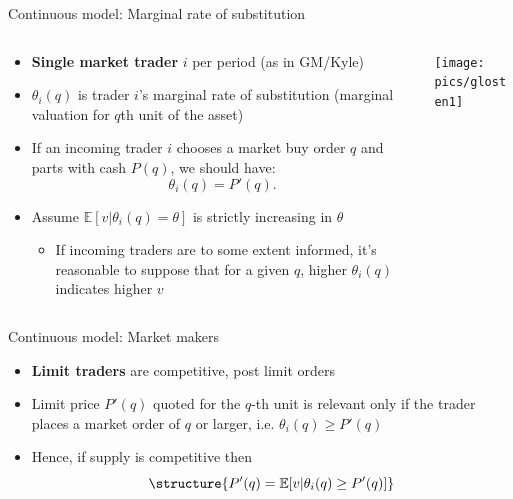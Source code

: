 \documentclass[english,10pt
,aspectratio=169
]{beamer}
\begin{document}
\begin{frame}{Continuous model: Marginal rate of substitution}
	\begin{columns}
		\begin{column}{0.7\linewidth}
			\begin{itemize}
				\item \textbf{Single market trader} $i$ per period (as in GM/Kyle)
				\item $\theta_i(q)$ is trader $i$'s marginal rate of substitution (marginal valuation for $q$th unit of the asset)
				\item If an incoming trader $i$ chooses a market buy order $q$ and parts with cash $P(q)$, we should have: \[\theta_i(q) = P'(q).\]
				\item Assume $\mathbb{E}[v|\theta_i(q) = \theta]$ is strictly increasing in $\theta$
				\begin{itemize}
					\item If incoming traders are to some extent informed, it's reasonable to suppose that for a given $q$, higher $\theta_i(q)$ indicates higher $v$
				\end{itemize}
			\end{itemize}
		\end{column}
		\begin{column}{0.3\linewidth}
			\texttt{[image: pics/glosten1]}
			\vspace{3em}
		\end{column}
	\end{columns}
\end{frame}


\begin{frame}{Continuous model: Market makers}
	\begin{itemize}	
		\item \textbf{Limit traders} are competitive, post limit orders
		\item Limit price $P'(q)$ quoted for the $q$-th unit is relevant only if the trader places a market order of $q$ or larger, i.e. $\theta_i(q) \geq P'(q)$
		\item Hence, if supply is competitive then
		\[
		\structure{P'(q) = \mathbb{E}[v|\theta_i(q) \geq P'(q)]}
		\]
	\end{itemize}
\end{frame}
\end{document}
